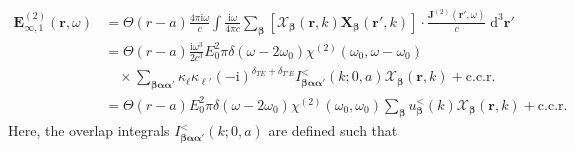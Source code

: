\documentclass{article}
\begin{document}
\begin{equation}\label{eq:Efree2_1}
\begin{split}
\mathbf{E}_{\infty,1}^{(2)}(\mathbf{r},\omega) &= \Theta(r - a)\frac{4\pi\mathrm{i}\omega}{c}\int\frac{\mathrm{i}\omega}{4\pi c}\sum_{\bm{\beta}}\left[\bm{\mathcal{X}}_{\bm{\beta}}(\mathbf{r},k)\mathbf{X}_{\bm{\beta}}(\mathbf{r}',k)\right]\cdot\frac{\mathbf{J}^{(2)}(\mathbf{r}',\omega)}{c}\;\mathrm{d}^3\mathbf{r}'\\
&= \Theta(r - a)\frac{\mathrm{i}\omega^3}{2c^3}E_0^2\pi\delta(\omega - 2\omega_0)\chi^{(2)}(\omega_0,\omega - \omega_0)\\
&\quad\times\sum_{\bm{\beta}\bm{\alpha}\bm{\alpha}'}\kappa_\ell\kappa_{\ell'}(-\mathrm{i})^{\delta_{TE} + \delta_{T'E}}I^{<}_{\bm{\beta}\bm{\alpha}\bm{\alpha}'}(k;0,a)\bm{\mathcal{X}}_{\bm{\beta}}(\mathbf{r},k) + \mathrm{c.c.r.}\\
&=\Theta(r - a)E_0^2\pi\delta(\omega - 2\omega_0)\chi^{(2)}(\omega_0,\omega_0)\sum_{\bm{\beta}}u_{\bm{\beta}}^<(k)\bm{\mathcal{X}}_{\bm{\beta}}(\mathbf{r},k) + \mathrm{c.c.r.}
\end{split}
\end{equation}
Here, the overlap integrals $I^{<}_{\bm{\beta}\bm{\alpha}\bm{\alpha}'}(k;0,a)$ are defined such that
\end{document}
